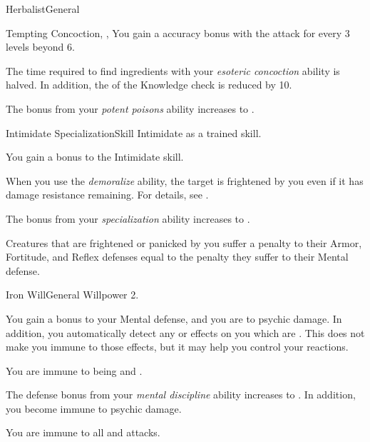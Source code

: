 \begin{feat}{Herbalist}{General}
\begin{magicalattuneability}{Tempting Concoction}{, , }
      \rankline
      You gain a  accuracy bonus with the attack for every 3 levels beyond 6.
    \end{magicalattuneability}

     The time required to find ingredients with your \textit{esoteric concoction} ability is halved.
    In addition, the  of the Knowledge check is reduced by 10.

     The bonus from your \textit{potent poisons} ability increases to .
  \end{feat}

  \begin{feat}{Intimidate Specialization}{Skill}
    \featpre Intimidate as a trained skill.

     You gain a  bonus to the Intimidate skill.

     When you use the \textit{demoralize} ability, the target is frightened by you even if it has damage resistance remaining.
    For details, see .

     The bonus from your \textit{specialization} ability increases to .

     Creatures that are frightened or panicked by you suffer a penalty to their Armor, Fortitude, and Reflex defenses equal to the penalty they suffer to their Mental defense.
  \end{feat}

  \begin{feat}{Iron Will}{General}
    \featpre Willpower 2.

     You gain a  bonus to your Mental defense, and you are \impervious to psychic damage.
    In addition, you automatically detect any  or  effects on you which are .
    This does not make you immune to those effects, but it may help you control your reactions.

     You are immune to being \stunned and \confused.

     The defense bonus from your \textit{mental discipline} ability increases to .
    In addition, you become immune to psychic damage.

     You are immune to all  and  attacks.
  \end{feat}

